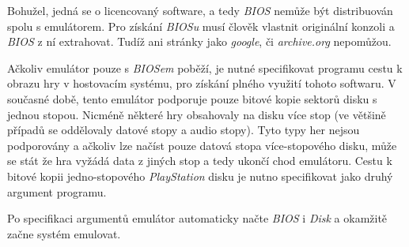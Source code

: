 Bohužel, jedná se o licencovaný software, a tedy \textit{BIOS} nemůže být distribuován spolu s emulátorem. Pro získání \textit{BIOSu} musí člověk
vlastnit originální konzoli a \textit{BIOS} z ní extrahovat. Tudíž ani stránky jako \textit{google}, či \textit{archive.org} nepomůžou. 

Ačkoliv emulátor pouze s \textit{BIOSem} poběží, je nutné specifikovat programu cestu k obrazu hry v hostovacím systému, pro
získání plného využití tohoto softwaru.
V současné době, tento emulátor podporuje pouze bitové kopie sektorů disku s jednou stopou. Nicméně některé hry
obsahovaly na disku více stop (ve většině případů se oddělovaly datové stopy a audio stopy). Tyto typy her
nejsou podporovány a ačkoliv lze načíst pouze datová stopa více-stopového disku, může se stát že hra vyžádá data
z jiných stop a tedy ukončí chod emulátoru.
Cestu k bitové kopii jedno-stopového \textit{PlayStation} disku je nutno specifikovat jako druhý argument programu.

Po specifikaci argumentů emulátor automaticky načte \textit{BIOS} i \textit{Disk} a okamžitě
začne systém emulovat.